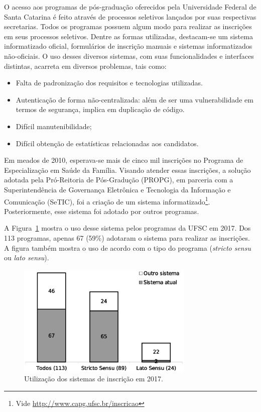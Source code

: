 \documentclass[
  10.5pt,				  %
	openright,			%
	twoside,			  %
  a5paper,
  chapter=TITLE,	%
	section=TITLE,	%
  hyphens,        %
	english,        %
	brazil          %
]{abntex2}
\begin{document}
O acesso aos programas de pós-graduação oferecidos pela Universidade Federal de Santa Catarina é feito através de processos seletivos lançados por suas respectivas secretarias. Todos os programas possuem algum modo para realizar as inscrições em seus processos seletivos. Dentre as formas utilizadas, destacam-se um sistema informatizado oficial, formulários de inscrição manuais e sistemas informatizados não-oficiais.
O uso desses diversos sistemas, com suas funcionalidades e interfaces distintas, acarreta em diversos problemas, tais como:
\begin{itemize}
  \item Falta de padronização dos requisitos e tecnologias utilizadas.
  \item Autenticação de forma não-centralizada: além de ser uma vulnerabilidade em termos de segurança, implica em duplicação de código.
  \item Difícil manutenibilidade;
  \item Difícil obtenção de estatísticas relacionadas aos candidatos.
\end{itemize}

Em meados de 2010, esperava-se mais de cinco mil inscrições no Programa de Especialização em Saúde da Família. Visando atender essas inscrições, a solução adotada pela Pró-Reitoria de Pós-Gradução (PROPG), em parceria com a Superintendência de Governança Eletrônica e Tecnologia da Informação e Comunicação (SeTIC), foi a criação de um sistema informatizado\footnote{Vide \href{http://www.capg.ufsc.br/inscricao}{http://www.capg.ufsc.br/inscricao}}. Posteriormente, esse sistema foi adotado por outros programas.

A Figura~\ref{fig:uso_sistemas} mostra o uso desse sistema pelos programas da UFSC em 2017. Dos 113 programas, apenas 67 (59\%) adotaram o sistema para realizar as inscrições. A figura também mostra o uso de acordo com o tipo do programa (\emph{stricto sensu} ou \emph{lato sensu}).


\begin{figure}[!ht]
  \caption{\label{fig:uso_sistemas}Utilização dos sistemas de inscrição em 2017.}
  \begin{center}
    \includegraphics[width=0.75\textwidth]{uso_sistema_atual}
  \end{center}
\end{figure}
\end{document}
